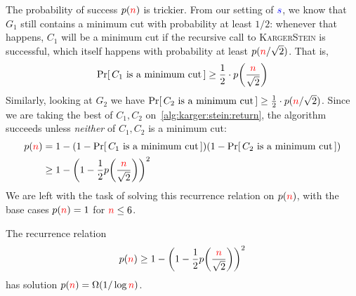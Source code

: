 The probability of success $p({\textcolor{red}{n}})$ is trickier. From our setting of $\textcolor{blue}{s}$, we know that $G_1$ still contains a minimum cut with probability at least $1/2$: whenever that happens, $C_1$ will be a minimum cut if the recursive call to \textsc{KargerStein} is successful, which itself happens with probability at least $p({\textcolor{red}{n}}/\sqrt{2})$. That is,
\[
    \probaOf{C_1\text{ is a minimum cut}} \geq \frac{1}{2}\cdot p\Paren{\frac{\ns}{\sqrt{2}}}
\]
Similarly, looking at $G_2$ we have $\probaOf{C_2\text{ is a minimum cut}} \geq \frac{1}{2}\cdot p({\ns}/\sqrt{2})$. Since we are taking the best of $C_1,C_2$ on~\cref{alg:karger:stein:return}, the algorithm succeeds unless \emph{neither} of $C_1,C_2$ is a minimum cut:
\begin{align*}
p(\ns) &= 1-\Paren{1-\probaOf{C_1\text{ is a minimum cut}}}\Paren{1-\probaOf{C_2\text{ is a minimum cut}}} \\
&\geq 1-\Paren{1-\frac{1}{2} p\Paren{\frac{\ns}{\sqrt{2}}}}^2
\end{align*}
We are left with the task of solving this recurrence relation on $p({\textcolor{red}{n}})$, with the base cases $p({\textcolor{red}{n}}) = 1$ for ${\textcolor{red}{n}}\leq 6$. 
\begin{claim}[\advancedstuff]
    The recurrence relation
    \[
       p(\ns) \geq 1-\Paren{1-\frac{1}{2} p\Paren{\frac{\ns}{\sqrt{2}}}}^2
    \]
    has solution $p(\ns) = \bigOmega{1/\log\ns}$.
\end{claim}

